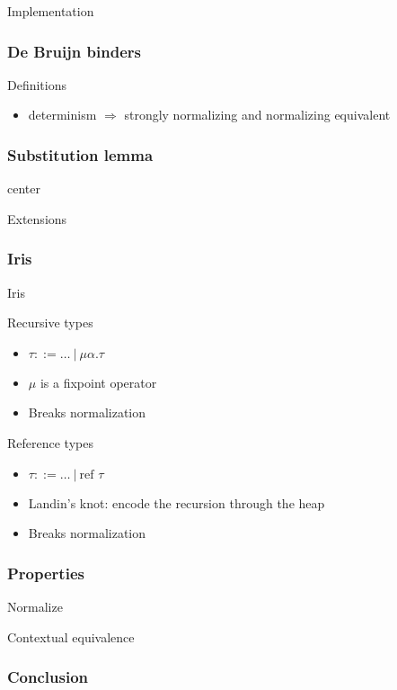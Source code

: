 \documentclass[xcolor={dvipsnames}]{beamer}
\newcommand\xxsectiontitle[1]{\begin{center}\Huge{#1}\end{center}}
\renewcommand\section[1]{\begin{frame}[noframenumbering]{}\xxsectiontitle{#1}\end{frame}}
\begin{document}
\section{Implementation}%

\begin{frame}
  \frametitle{De Bruijn binders}
  \begin{block}{Definitions}
    \begin{itemize}
      \item determinism $\Rightarrow$ strongly normalizing and normalizing equivalent
    \end{itemize}
  \end{block}
\end{frame}


\begin{frame}
  \frametitle{Substitution lemma}
  \begin{center}
    center
  \end{center}

\end{frame}

\section{Extensions}%

\begin{frame}
  \frametitle{Iris}
  Iris

  \begin{block}{Recursive types}
    \begin{itemize}
      \item $\tau ::= \ldots\ |\ \mu \alpha. \tau$
      \item $\mu$ is a fixpoint operator
      \item Breaks normalization
    \end{itemize}
  \end{block}

  \begin{block}{Reference types}
    \begin{itemize}
      \item $\tau ::= \ldots\ |\ \text{ref } \tau$
      \item Landin's knot: encode the recursion through the heap
      \item Breaks normalization
    \end{itemize}
  \end{block}
\end{frame}

\begin{frame}
  \frametitle{Properties}
  \begin{block}{Normalize}
  \end{block}

  \begin{block}{Contextual equivalence}
  \end{block}
\end{frame}

\begin{frame}
  \frametitle{Conclusion}
\end{frame}
\end{document}
